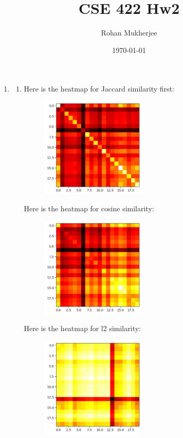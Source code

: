 \documentclass[12pt]{article}
\title{CSE 422 Hw2}
\date{\today}
\author{Rohan Mukherjee}
\theoremstyle{definitionstyle}
\begin{document}
    \maketitle
    \begin{enumerate}[leftmargin=\labelsep]
        \item
        \begin{enumerate}
            \item Here is the heatmap for Jaccard similarity first:
            \begin{figure}[H]
                \centering
                \includegraphics[width=0.5\textwidth]{jaccard_heatmap.png}
            \end{figure}
            Here is the heatmap for cosine similarity:
            \begin{figure}[H]
                \centering
                \includegraphics[width=0.5\textwidth]{cosine_heatmap.png}
            \end{figure}
            Here is the heatmap for l2 similarity:
            \begin{figure}[H]
                \centering
                \includegraphics[width=0.5\textwidth]{l2_heatmap.png}

\end{figure}
\end{enumerate}
\end{enumerate}
\end{document}
